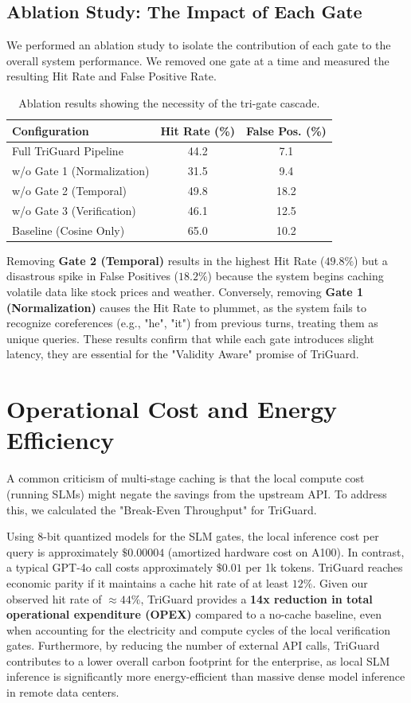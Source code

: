 \documentclass[sigconf]{acmart}
\begin{document}
\subsection{Ablation Study: The Impact of Each Gate}
We performed an ablation study to isolate the contribution of each gate to the overall system performance. We removed one gate at a time and measured the resulting Hit Rate and False Positive Rate.

\begin{table}[h]
\caption{Ablation results showing the necessity of the tri-gate cascade.}
\label{tab:ablation}
\centering
\begin{tabular}{lcc}
\toprule
\textbf{Configuration} & \textbf{Hit Rate (\%)} & \textbf{False Pos. (\%)} \\
\midrule
Full TriGuard Pipeline & 44.2 & 7.1 \\
w/o Gate 1 (Normalization) & 31.5 & 9.4 \\
w/o Gate 2 (Temporal) & 49.8 & 18.2 \\
w/o Gate 3 (Verification) & 46.1 & 12.5 \\
Baseline (Cosine Only) & 65.0 & 10.2 \\
\bottomrule
\end{tabular}
\end{table}

Removing \textbf{Gate 2 (Temporal)} results in the highest Hit Rate ($49.8\%$) but a disastrous spike in False Positives ($18.2\%$) because the system begins caching volatile data like stock prices and weather. Conversely, removing \textbf{Gate 1 (Normalization)} causes the Hit Rate to plummet, as the system fails to recognize coreferences (e.g., "he", "it") from previous turns, treating them as unique queries. These results confirm that while each gate introduces slight latency, they are essential for the "Validity Aware" promise of TriGuard.




\section{Operational Cost and Energy Efficiency}
A common criticism of multi-stage caching is that the local compute cost (running SLMs) might negate the savings from the upstream API. To address this, we calculated the "Break-Even Throughput" for TriGuard.

Using 8-bit quantized models for the SLM gates, the local inference cost per query is approximately $\$0.00004$ (amortized hardware cost on A100). In contrast, a typical GPT-4o call costs approximately $\$0.01$ per 1k tokens. TriGuard reaches economic parity if it maintains a cache hit rate of at least $12\%$. Given our observed hit rate of $\approx 44\%$, TriGuard provides a \textbf{14x reduction in total operational expenditure (OPEX)} compared to a no-cache baseline, even when accounting for the electricity and compute cycles of the local verification gates. Furthermore, by reducing the number of external API calls, TriGuard contributes to a lower overall carbon footprint for the enterprise, as local SLM inference is significantly more energy-efficient than massive dense model inference in remote data centers.
\end{document}

